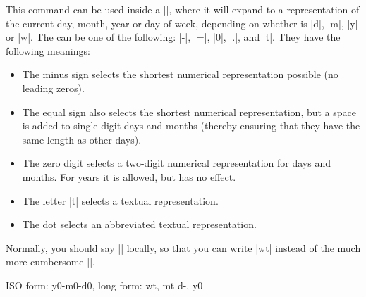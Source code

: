 \begin{command}{\pgfcalendar{}}
\begin{codeexample}[preamble={\usepackage{pgfcalendar}}]
\end{codeexample}
\end{command}

\begin{command}{\pgfcalendarshorthand{}}
\label{pgfcalendarshorthand}
    This command can be used inside a |\pgfcalendar|, where it will expand to a
    representation of the current day, month, year or day of week, depending on
    whether  is |d|, |m|, |y| or |w|. The  can
    be one of the following: |-|, |=|, |0|, |.|, and |t|. They have the
    following meanings:
    \begin{itemize}
        \item The minus sign selects the shortest numerical representation
            possible (no leading zeros).
        \item The equal sign also selects the shortest numerical
            representation, but a space is added to single digit days and
            months (thereby ensuring that they have the same length as other
            days).
        \item The zero digit selects a two-digit numerical representation for
            days and months. For years it is allowed, but has no effect.
        \item The letter |t| selects a textual representation.
        \item The dot selects an abbreviated textual representation.
    \end{itemize}
    Normally, you should say |\let\%=\pgfcalendarshorthand| locally, so that
    you can write |\%wt| instead of the much more cumbersome
    ||.
\begin{codeexample}[leave comments,preamble={\usepackage{pgfcalendar}}]
\let\%=\pgfcalendarshorthand
{}
{ ISO form: \%y0-\%m0-\%d0, long form: \%wt, \%mt \%d-, \%y0}
\end{codeexample}
\end{command}

